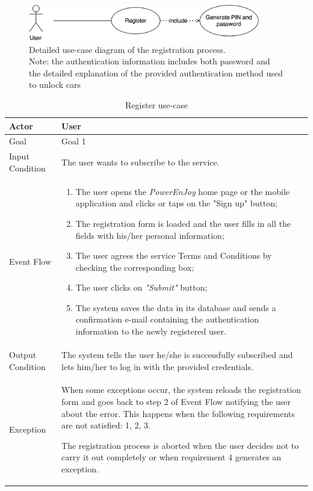 \begin{figure}[H]
\begin{center}
		\includegraphics[width=0.9\textwidth]{./specific_requirements/features/diagrams/registration_proc_uc.png}
		\caption{Detailed use-case diagram of the registration process.\\Note: the authentication information includes both password and the detailed explanation of the provided authentication method used to unlock cars}
		\label{register_det_uc}
\end{center}
\end{figure}

\begin{table}[H]
\begin{center}
\begin{tabular}{p{} | p{}}
\hline
Actor & User\\
\hline
Goal & Goal 1\\
\hline
Input Condition & The user wants to subscribe to the service.\\
\hline
Event Flow & 
\begin{enumerate}
\item The user opens the \emph{PowerEnJoy} home page or the mobile application and clicks or taps on the "Sign up" button;
\item The registration form is loaded and the user fills in all the fields with his/her personal information;
\item The user agrees the service Terms and Conditions by checking the corresponding box;
\item The user clicks on \emph{"Submit"} button;
\item The system saves the data in its database and sends a confirmation e-mail containing the authentication information to the newly registered user.
\end{enumerate} \\
\hline
Output Condition & The system tells the user he/she is successfully subscribed and lets him/her to log in with the provided credentials.\\
\hline
Exception & When some exceptions occur, the system reloads the registration form and goes back to step 2 of Event Flow notifying the user about the error. This happens when the following requirements are not satisfied: 1, 2, 3.

The registration process is aborted when the user decides not to carry it out completely or when requirement 4 generates an exception.\\
\hline
\end{tabular}
\end{center}
\caption{Register use-case}
\label{register_uc}
\end{table}

